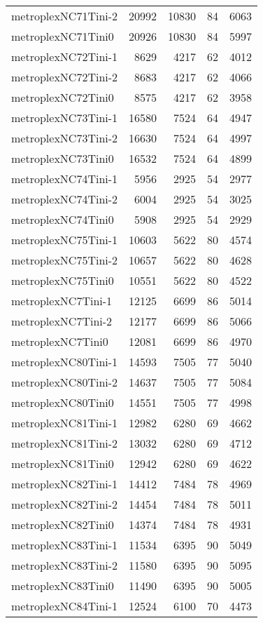 \begin{longtable}{lrrrr}
metroplexNC71Tini-2 & 20992 & 10830 & 84 & 6063 \\
metroplexNC71Tini0 & 20926 & 10830 & 84 & 5997 \\
metroplexNC72Tini-1 & 8629 & 4217 & 62 & 4012 \\
metroplexNC72Tini-2 & 8683 & 4217 & 62 & 4066 \\
metroplexNC72Tini0 & 8575 & 4217 & 62 & 3958 \\
metroplexNC73Tini-1 & 16580 & 7524 & 64 & 4947 \\
metroplexNC73Tini-2 & 16630 & 7524 & 64 & 4997 \\
metroplexNC73Tini0 & 16532 & 7524 & 64 & 4899 \\
metroplexNC74Tini-1 & 5956 & 2925 & 54 & 2977 \\
metroplexNC74Tini-2 & 6004 & 2925 & 54 & 3025 \\
metroplexNC74Tini0 & 5908 & 2925 & 54 & 2929 \\
metroplexNC75Tini-1 & 10603 & 5622 & 80 & 4574 \\
metroplexNC75Tini-2 & 10657 & 5622 & 80 & 4628 \\
metroplexNC75Tini0 & 10551 & 5622 & 80 & 4522 \\
metroplexNC7Tini-1 & 12125 & 6699 & 86 & 5014 \\
metroplexNC7Tini-2 & 12177 & 6699 & 86 & 5066 \\
metroplexNC7Tini0 & 12081 & 6699 & 86 & 4970 \\
metroplexNC80Tini-1 & 14593 & 7505 & 77 & 5040 \\
metroplexNC80Tini-2 & 14637 & 7505 & 77 & 5084 \\
metroplexNC80Tini0 & 14551 & 7505 & 77 & 4998 \\
metroplexNC81Tini-1 & 12982 & 6280 & 69 & 4662 \\
metroplexNC81Tini-2 & 13032 & 6280 & 69 & 4712 \\
metroplexNC81Tini0 & 12942 & 6280 & 69 & 4622 \\
metroplexNC82Tini-1 & 14412 & 7484 & 78 & 4969 \\
metroplexNC82Tini-2 & 14454 & 7484 & 78 & 5011 \\
metroplexNC82Tini0 & 14374 & 7484 & 78 & 4931 \\
metroplexNC83Tini-1 & 11534 & 6395 & 90 & 5049 \\
metroplexNC83Tini-2 & 11580 & 6395 & 90 & 5095 \\
metroplexNC83Tini0 & 11490 & 6395 & 90 & 5005 \\
metroplexNC84Tini-1 & 12524 & 6100 & 70 & 4473 \\

\end{longtable}
